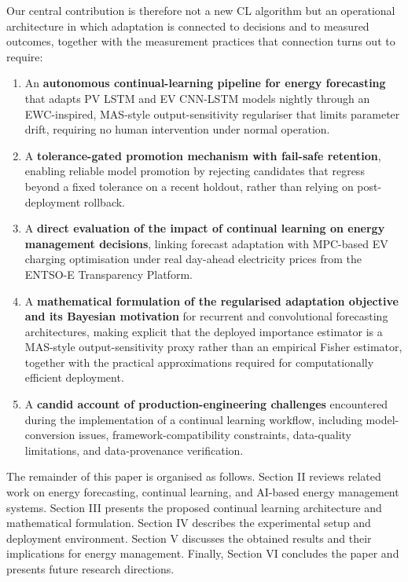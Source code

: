 \documentclass[journal]{IEEEtran}
\begin{document}
Our central contribution is therefore not a new CL algorithm but an operational
architecture in which adaptation is connected to decisions and to measured
outcomes, together with the measurement practices that connection turns out to
require:

\begin{enumerate}

    \item An \textbf{autonomous continual-learning pipeline for energy forecasting} that adapts PV LSTM and EV CNN-LSTM models nightly through an EWC-inspired, MAS-style output-sensitivity regulariser that limits parameter drift, requiring no human intervention under normal operation.

    \item A \textbf{tolerance-gated promotion mechanism with fail-safe retention}, enabling reliable model promotion by rejecting candidates that regress beyond a fixed tolerance on a recent holdout, rather than relying on post-deployment rollback.

    \item A \textbf{direct evaluation of the impact of continual learning on energy management decisions}, linking forecast adaptation with MPC-based EV charging optimisation under real day-ahead electricity prices from the ENTSO-E Transparency Platform.

    \item A \textbf{mathematical formulation of the regularised adaptation objective and its Bayesian motivation} for recurrent and convolutional forecasting architectures, making explicit that the deployed importance estimator is a MAS-style output-sensitivity proxy rather than an empirical Fisher estimator, together with the practical approximations required for computationally efficient deployment.

    \item A \textbf{candid account of production-engineering challenges} encountered during the implementation of a continual learning workflow, including model-conversion issues, framework-compatibility constraints, data-quality limitations, and data-provenance verification.

\end{enumerate}

The remainder of this paper is organised as follows. Section II reviews related work on energy forecasting, continual learning, and AI-based energy management systems. Section III presents the proposed continual learning architecture and mathematical formulation. Section IV describes the experimental setup and deployment environment. Section V discusses the obtained results and their implications for energy management. Finally, Section VI concludes the paper and presents future research directions.
\end{document}
